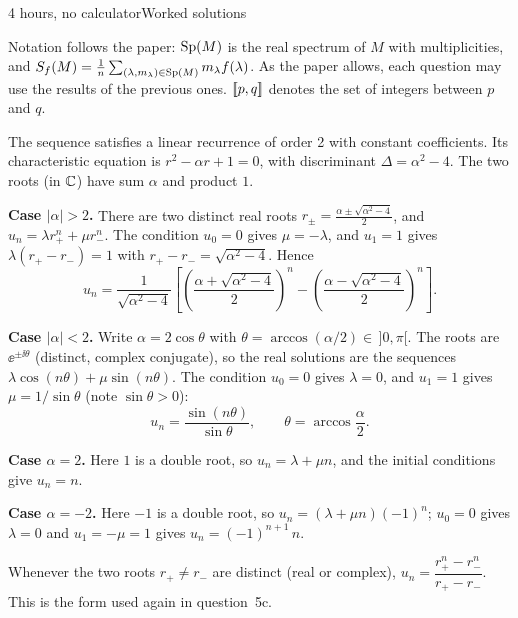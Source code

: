 \documentclass[11pt,a4paper]{article}
\begin{document}
         {4 hours, no calculator}{Worked solutions}

\begin{remark}
Notation follows the paper: $\operatorname{Sp}(M)$ is the real spectrum of $M$ with multiplicities, and
$S_f(M) = \frac1n\sum_{(\lambda,m_\lambda)\in\operatorname{Sp}(M)} m_\lambda f(\lambda)$. As the paper allows,
each question may use the results of the previous ones. $[\![p,q]\!]$ denotes the set of
integers between $p$ and $q$.
\end{remark}


The sequence satisfies a linear recurrence of order 2 with constant coefficients. Its
characteristic equation is $r^2 - \alpha r + 1 = 0$, with discriminant $\Delta = \alpha^2 - 4$.
The two roots (in $\mathbb{C}$) have sum $\alpha$ and product $1$.

\textbf{Case $|\alpha| > 2$.} There are two distinct real roots
$r_\pm = \frac{\alpha \pm \sqrt{\alpha^2-4}}{2}$, and $u_n = \lambda r_+^n + \mu r_-^n$.
The condition $u_0 = 0$ gives $\mu = -\lambda$, and $u_1 = 1$ gives
$\lambda(r_+ - r_-) = 1$ with $r_+ - r_- = \sqrt{\alpha^2-4}$. Hence
\[
  u_n = \frac{1}{\sqrt{\alpha^2-4}}\left[\left(\frac{\alpha+\sqrt{\alpha^2-4}}{2}\right)^{\!n}
        - \left(\frac{\alpha-\sqrt{\alpha^2-4}}{2}\right)^{\!n}\right].
\]

\textbf{Case $|\alpha| < 2$.} Write $\alpha = 2\cos\theta$ with
$\theta = \arccos(\alpha/2) \in \,]0,\pi[$. The roots are $\ee^{\pm\ii\theta}$ (distinct,
complex conjugate), so the real solutions are the sequences
$\lambda\cos(n\theta) + \mu\sin(n\theta)$. The condition $u_0 = 0$ gives $\lambda = 0$, and
$u_1 = 1$ gives $\mu = 1/\sin\theta$ (note $\sin\theta > 0$):
\[
  u_n = \frac{\sin(n\theta)}{\sin\theta}, \qquad \theta = \arccos\frac{\alpha}{2}.
\]

\textbf{Case $\alpha = 2$.} Here $1$ is a double root, so $u_n = \lambda + \mu n$, and the
initial conditions give $u_n = n$.

\textbf{Case $\alpha = -2$.} Here $-1$ is a double root, so $u_n = (\lambda + \mu n)(-1)^n$;
$u_0 = 0$ gives $\lambda = 0$ and $u_1 = -\mu = 1$ gives $u_n = (-1)^{n+1}\,n$.

\begin{remark}
Whenever the two roots $r_+ \neq r_-$ are distinct (real or complex),
$u_n = \dfrac{r_+^n - r_-^n}{r_+ - r_-}$. This is the form used again in question~5c.
\end{remark}
\end{document}
